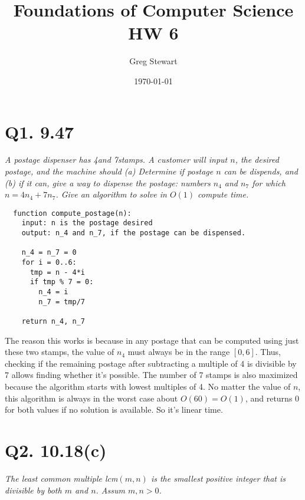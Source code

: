 \documentclass{article}
\title{Foundations of Computer Science HW 6}
\author{Greg Stewart}
\date{\today}
\begin{document}
\maketitle

\section*{Q1. 9.47}

\textit{A postage dispenser has 4\cent and 7\cent stamps. A customer will input $n$, the desired postage, and the machine should (a) Determine if postage $n$ can be dispends, and (b) if it can, give a way to dispense the postage: numbers $n_4$ and $n_7$ for which $n = 4n_4 + 7n_7$. Give an algorithm to solve in $O(1)$ compute time.}

\begin{verbatim}
  function compute_postage(n):
    input: n is the postage desired
    output: n_4 and n_7, if the postage can be dispensed.

    n_4 = n_7 = 0
    for i = 0..6:
      tmp = n - 4*i
      if tmp % 7 = 0:
        n_4 = i
        n_7 = tmp/7

    return n_4, n_7
\end{verbatim}

The reason this works is because in any postage that can be computed using just these two stamps, the value of $n_4$ must always be in the range $[0,6]$. Thus, checking if the remaining postage after subtracting a multiple of 4 is divisible by 7 allows finding whether it's possible. The number of 7 \cent stamps is also maximized because the algorithm starts with lowest multiples of 4. No matter the value of $n$, this algorithm is always in the worst case about $O(60) = O(1)$, and returns 0 for both values if no solution is available. So it's linear time.



\section*{Q2. 10.18(c)}

\textit{The least common multiple lcm$(m,n)$ is the smallest positive integer that is divisible by both $m$ and $n$. Assum $m,n > 0$.}
\end{document}
